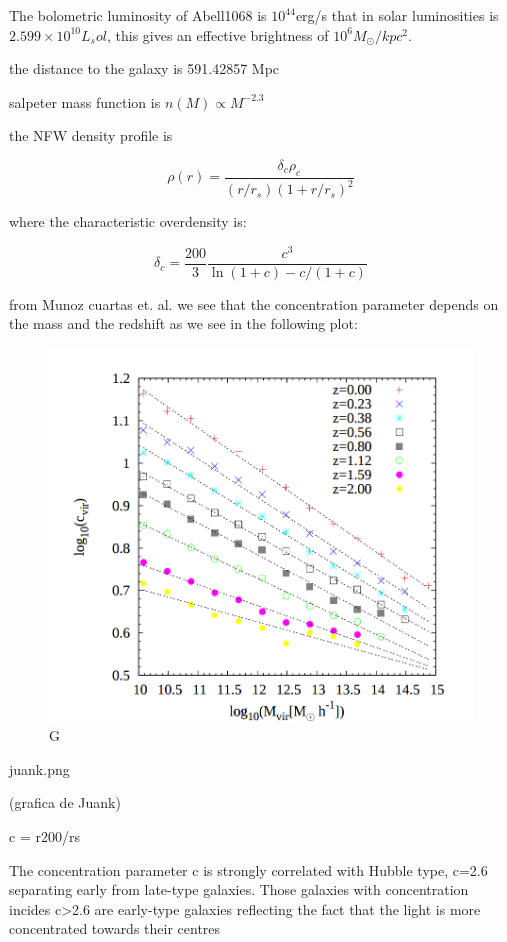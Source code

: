 The bolometric luminosity of Abell1068 is $10^44$erg/s that in solar luminosities is $2.599\times 10^{10} L_sol$, this gives an effective brightness of $10^{6}M_{\odot}/kpc^2$.

the distance to the galaxy is 591.42857 Mpc	

salpeter mass function is $n(M)\propto M^{-2.3}$  

the NFW density profile is 

\begin{equation}
\rho(r)=\frac{\delta_{c}\rho_{c}}{(r/r_{s})(1+r/r_{s})^{2}}
\end{equation}

where the characteristic overdensity is:

\begin{equation}
\delta_{c}=\frac{200}{3}\frac{c^{3}}{\ln{(1+c)}-c/(1+c)}
\end{equation}

from Munoz cuartas et. al. we see that the concentration parameter depends on the mass and the redshift as we see in the following plot:

\begin{figure}[H]
\centering
\includegraphics[width=12cm]{images/juank.png}
\caption[M]{G}
\end{figure}
juank.png

(grafica de Juank)

c = r200/rs

The concentration parameter c is strongly correlated with Hubble type, c=2.6 separating early from late-type galaxies. Those galaxies with concentration incides c>2.6 are early-type galaxies reflecting the fact that the light is more concentrated towards their centres

